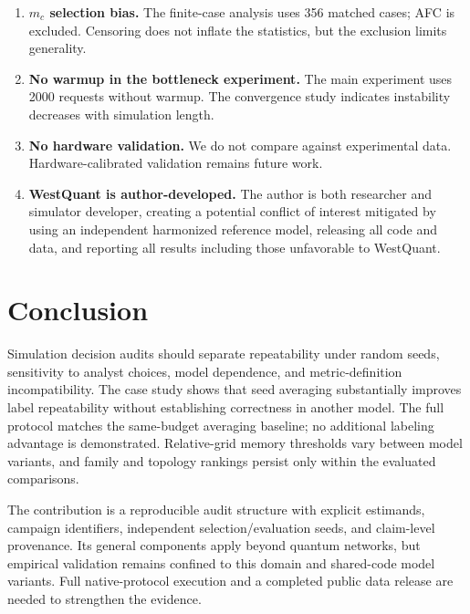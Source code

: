 \documentclass{ams-journal}
\begin{document}
\begin{enumerate}[leftmargin=2em]
\item \textbf{$m_c$ selection bias.} The finite-case analysis uses 356 matched cases; AFC is excluded. Censoring does not inflate the statistics, but the exclusion limits generality.

\item \textbf{No warmup in the bottleneck experiment.} The main experiment uses 2000 requests without warmup. The convergence study indicates instability decreases with simulation length.

\item \textbf{No hardware validation.} We do not compare against experimental data. Hardware-calibrated validation remains future work.

\item \textbf{WestQuant is author-developed.} The author is both researcher and simulator developer, creating a potential conflict of interest mitigated by using an independent harmonized reference model, releasing all code and data, and reporting all results including those unfavorable to WestQuant.
\end{enumerate}

\section{Conclusion}
\label{sec:conclusion}

Simulation decision audits should separate repeatability under random seeds, sensitivity to analyst choices, model dependence, and metric-definition incompatibility. The case study shows that seed averaging substantially improves label repeatability without establishing correctness in another model. The full protocol matches the same-budget averaging baseline; no additional labeling advantage is demonstrated. Relative-grid memory thresholds vary between model variants, and family and topology rankings persist only within the evaluated comparisons.

The contribution is a reproducible audit structure with explicit estimands, campaign identifiers, independent selection/evaluation seeds, and claim-level provenance. Its general components apply beyond quantum networks, but empirical validation remains confined to this domain and shared-code model variants. Full native-protocol execution and a completed public data release are needed to strengthen the evidence.

\end{document}
